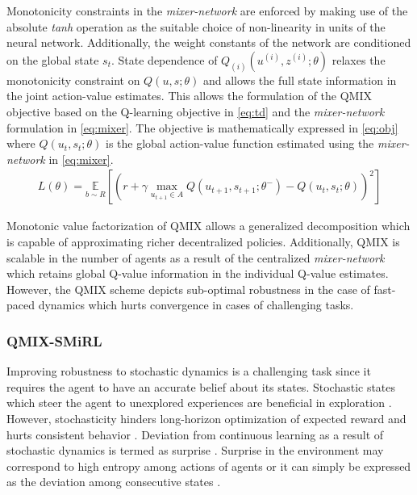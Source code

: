 \documentclass{article}
\begin{document}
\begin{multicols}{2}
Monotonicity constraints in the \textit{mixer-network} are enforced by making use of the absolute \textit{tanh} operation as the suitable choice of non-linearity in units of the neural network. Additionally, the weight constants of the network are conditioned on the global state $s_{t}$. State dependence of $Q_{(i)}(u^{(i)},z^{(i)};\theta)$ relaxes the monotonicity constraint on $Q(u,s;\theta)$ and allows the full state information in the joint action-value estimates. This allows the formulation of the QMIX objective based on the Q-learning objective in \autoref{eq:td} and the \textit{mixer-network} formulation in \autoref{eq:mixer}. The objective is mathematically expressed in \autoref{eq:obj} where $Q(u_{t},s_{t};\theta)$ is the global action-value function estimated using the \textit{mixer-network} in \autoref{eq:mixer}.
\begin{gather}
  L(\theta) = \underset{b \sim R}{\mathbb{E}}[(r + \gamma \underset{u_{t+1}\in A}{\max} Q(u_{t+1},s_{t+1};\theta^{-}) - Q(u_{t},s_{t};\theta))^{2}] \label{eq:obj}
\end{gather}

Monotonic value factorization of QMIX allows a generalized decomposition which is capable of approximating richer decentralized policies. Additionally, QMIX is scalable in the number of agents as a result of the centralized \textit{mixer-network} which retains global Q-value information in the individual Q-value estimates. However, the QMIX scheme depicts sub-optimal robustness in the case of fast-paced dynamics \cite{smac} which hurts convergence in cases of challenging tasks. 

\subsubsection{QMIX-SMiRL}
Improving robustness to stochastic dynamics is a challenging task since it requires the agent to have an accurate belief about its states. Stochastic states which steer the agent to unexplored experiences are beneficial in exploration \cite{curiosity}. However, stochasticity hinders long-horizon optimization of expected reward and hurts consistent behavior \cite{surprise}. Deviation from continuous learning as a result of stochastic dynamics is termed as surprise \cite{surprise}. Surprise in the environment may correspond to high entropy among actions of agents \cite{surpmodeling} or it can simply be expressed as the deviation among consecutive states \cite{smirl,gen}. 


\end{multicols}
\end{document}
